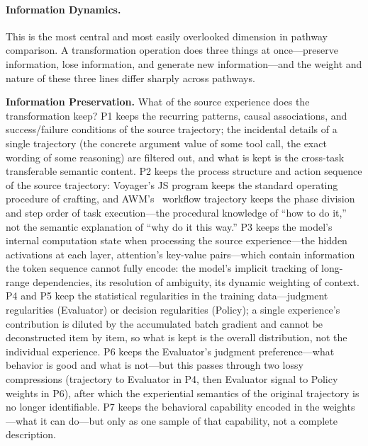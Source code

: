 \paragraph{Information Dynamics.} This is the most central and most easily overlooked dimension in pathway comparison. A transformation operation does three things at once---preserve information, lose information, and generate new information---and the weight and nature of these three lines differ sharply across pathways.

\textbf{Information Preservation.} What of the source experience does the transformation keep? P1 keeps the recurring patterns, causal associations, and success/failure conditions of the source trajectory; the incidental details of a single trajectory (the concrete argument value of some tool call, the exact wording of some reasoning) are filtered out, and what is kept is the cross-task transferable semantic content. P2 keeps the process structure and action sequence of the source trajectory: Voyager's JS program keeps the standard operating procedure of crafting, and AWM's~\cite{Wan24} workflow trajectory keeps the phase division and step order of task execution---the procedural knowledge of ``how to do it,'' not the semantic explanation of ``why do it this way.'' P3 keeps the model's internal computation state when processing the source experience---the hidden activations at each layer, attention's key-value pairs---which contain information the token sequence cannot fully encode: the model's implicit tracking of long-range dependencies, its resolution of ambiguity, its dynamic weighting of context. P4 and P5 keep the statistical regularities in the training data---judgment regularities (Evaluator) or decision regularities (Policy); a single experience's contribution is diluted by the accumulated batch gradient and cannot be deconstructed item by item, so what is kept is the overall distribution, not the individual experience. P6 keeps the Evaluator's judgment preference---what behavior is good and what is not---but this passes through two lossy compressions (trajectory to Evaluator in P4, then Evaluator signal to Policy weights in P6), after which the experiential semantics of the original trajectory is no longer identifiable. P7 keeps the behavioral capability encoded in the weights---what it can do---but only as one sample of that capability, not a complete description.

